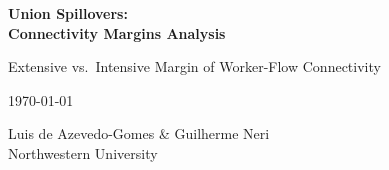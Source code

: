 \documentclass[12pt,letterpaper]{article}
\begin{document}
\begin{titlepage}
\centering
\vspace*{2cm}
{\Huge\bfseries Union Spillovers:\\Connectivity Margins Analysis\par}
\vspace{2cm}
{\Large Extensive vs.\ Intensive Margin of Worker-Flow Connectivity\par}
\vspace{1cm}
{\large \today\par}
\vfill
{\large Luis de Azevedo-Gomes \& Guilherme Neri\\Northwestern University\par}
\end{titlepage}

\tableofcontents
\clearpage
\end{document}
